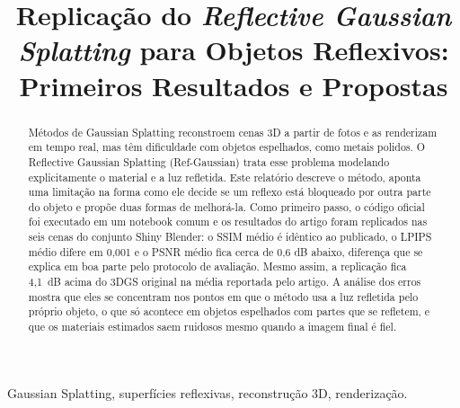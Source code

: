 \documentclass[conference]{IEEEtran}
\begin{document}
\title{Replicação do \textit{Reflective Gaussian Splatting} para Objetos Reflexivos: Primeiros Resultados e Propostas}

\author{
\and
{}
}

\maketitle

\begin{abstract}
Métodos de Gaussian Splatting reconstroem cenas 3D a partir de fotos e as renderizam em tempo real, mas têm dificuldade com objetos espelhados, como metais polidos. O Reflective Gaussian Splatting (Ref-Gaussian) trata esse problema modelando explicitamente o material e a luz refletida. Este relatório descreve o método, aponta uma limitação na forma como ele decide se um reflexo está bloqueado por outra parte do objeto e propõe duas formas de melhorá-la. Como primeiro passo, o código oficial foi executado em um notebook comum e os resultados do artigo foram replicados nas seis cenas do conjunto Shiny Blender: o SSIM médio é idêntico ao publicado, o LPIPS médio difere em 0,001 e o PSNR médio fica cerca de 0,6 dB abaixo, diferença que se explica em boa parte pelo protocolo de avaliação. Mesmo assim, a replicação fica 4,1~dB acima do 3DGS original na média reportada pelo artigo. A análise dos erros mostra que eles se concentram nos pontos em que o método usa a luz refletida pelo próprio objeto, o que só acontece em objetos espelhados com partes que se refletem, e que os materiais estimados saem ruidosos mesmo quando a imagem final é fiel.
\end{abstract}

\begin{IEEEkeywords}
Gaussian Splatting, superfícies reflexivas, reconstrução 3D, renderização.
\end{IEEEkeywords}

\end{document}
